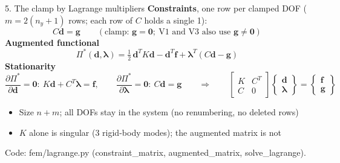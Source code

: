 \documentclass[aspectratio=169,10pt]{beamer}
\newcommand{\vd}{\mathbf d}
\newcommand{\vf}{\mathbf f}
\newcommand{\vg}{\mathbf g}
\newcommand{\vlam}{\bm{\lambda}}
\newcommand{\src}[1]{{\color{muted}\scriptsize #1}}
\begin{document}
\begin{frame}{5. The clamp by Lagrange multipliers}
  \textbf{Constraints}, one row per clamped DOF ($m=2(n_y+1)$ rows; each row of $C$ holds a single 1):
  \[
    C\vd=\vg\qquad(\text{clamp: }\vg=\mathbf 0;\ \text{V1 and V3 also use }\vg\ne\mathbf 0)
  \]
  \textbf{Augmented functional}
  \[
    \Pi^*(\vd,\vlam)=\tfrac12\,\vd^TK\vd-\vd^T\vf+\vlam^T(C\vd-\vg)
  \]
  \textbf{Stationarity}
  \[
    \frac{\partial\Pi^*}{\partial\vd}=\mathbf 0:\ K\vd+C^T\vlam=\vf,\qquad
    \frac{\partial\Pi^*}{\partial\vlam}=\mathbf 0:\ C\vd=\vg
    \qquad\Longrightarrow\qquad
    \boxed{\begin{bmatrix}K&C^T\\ C&0\end{bmatrix}\begin{Bmatrix}\vd\\ \vlam\end{Bmatrix}=\begin{Bmatrix}\vf\\ \vg\end{Bmatrix}}
  \]
  \begin{itemize}
    \item Size $n+m$; all DOFs stay in the system (no renumbering, no deleted rows)
    \item $K$ alone is singular (3 rigid-body modes); the augmented matrix is not
  \end{itemize}
  \vfill
  \src{Code: fem/lagrange.py (constraint\_matrix, augmented\_matrix, solve\_lagrange).}
\end{frame}
\end{document}
